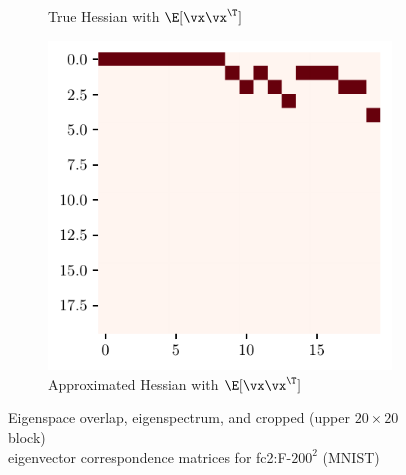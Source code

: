 \begin{figure}[H]
\begin{subfigure}[b]{0.24\textwidth}
        \caption{True Hessian with $\E[\vx\vx^\T]$}
        \label{fig:app_adexp_fc2_corr_real}
    \end{subfigure}
    \begin{subfigure}[b]{0.24\textwidth}
        \centering
        \captionsetup{justification=centering}
        \includegraphics[width=\textwidth]{Appendix_Figures/Overlap_large_model/FailExplanation/FC2/xxT_Approxest_real_corr_expand_t20_MNIST_Exp1_FC2_fixlr0.01R1_E-1_fc2.pdf}
        \caption{Approximated Hessian with $\E[\vx\vx^\T]$}
        \label{fig:app_adexp_fc2_corr_est}
    \end{subfigure}
    \captionsetup{justification=centering}
    \caption{Eigenspace overlap, eigenspectrum, and cropped (upper $20\times 20$ block)\\eigenvector correspondence matrices for fc2:F-$200^2$ (MNIST)}
    \vspace{-0.1in}
    \label{fig:app_adexp_fc2}
\end{figure}

